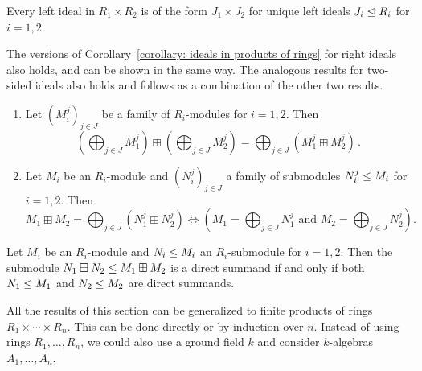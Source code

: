 \begin{corollary}
  \label{corollary: ideals in products of rings}
  Every left ideal in $R_1 \times R_2$ is of the form $J_1 \times J_2$ for unique left ideals $J_i \trianglelefteq R_i$ for $i = 1, 2$.
\end{corollary}


\begin{remark}
  The versions of Corollary~\ref{corollary: ideals in products of rings} for right ideals also holds, and can be shown in the same way.
  The analogous results for two-sided ideals also holds and follows as a combination of the other two results.
\end{remark}


\begin{lemma}
  \leavevmode
  \begin{enumerate}
    \item
      Let $(M^j_i)_{j \in J}$ be a family of $R_i$-modules for $i = 1, 2$.
      Then
      \[
            \left( \bigoplus_{j \in J} M^j_1 \right) \boxplus \left( \bigoplus_{j \in J} M^j_2 \right)
          = \bigoplus_{j \in J} (M^j_1 \boxplus M^j_2) \,.
      \]
    \item
      Let $M_i$ be an $R_i$-module and $(N^j_i)_{j \in J}$ a family of submodules $N^j_i \leq M_i$ for $i = 1, 2$.
      Then
      \[
              M_1 \boxplus M_2 = \bigoplus_{j \in J} \left( N^j_1 \boxplus N^j_2 \right)
        \iff  \left(
                \text{$M_1  = \bigoplus_{j \in J} N^j_1$ and $M_2  = \bigoplus_{j \in J} N^j_2$}
              \right).
      \]
  \end{enumerate}
\end{lemma}


\begin{corollary}
  Let $M_i$ be an $R_i$-module and $N_i \leq M_i$ an $R_i$-submodule for $i = 1, 2$.
  Then the submodule $N_1 \boxplus N_2 \leq M_1 \boxplus M_2$ is a direct summand if and only if both $N_1 \leq M_1$ and $N_2 \leq M_2$ are direct summands.
\end{corollary}


\begin{remark}
  All the results of this section can be generalized to finite products of rings $R_1 \times \dotsb \times R_n$.
  This can be done directly or by induction over $n$.
  Instead of using rings $R_1, \dotsc, R_n$, we could also use a ground field $k$ and consider $k$-algebras $A_1, \dotsc, A_n$.
\end{remark}


